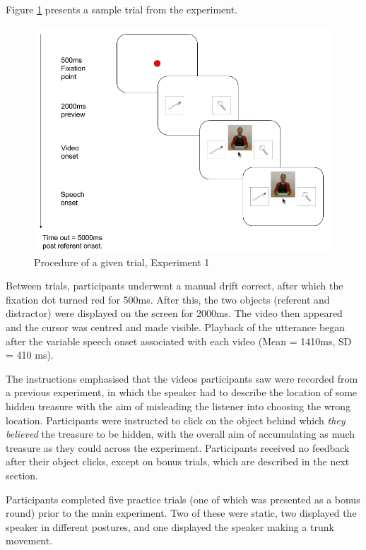 \documentclass[a4paper,man,natbib]{apa6}
\begin{document}
Figure \ref{fig:v1_trial} presents a sample trial from the experiment. 
\begin{figure}[Ht]
  \centering
	\includegraphics[width=\linewidth]{./img/e7_trial.png}
  \caption{Procedure of a given trial, Experiment 1}
  \label{fig:v1_trial}
\end{figure}
Between trials, participants underwent a manual drift correct, after which the fixation dot turned red for 500ms. 
After this, the two objects (referent and distractor) were displayed on the screen for 2000ms.
The video then appeared and the cursor was centred and made visible.
Playback of the utterance began after the variable speech onset associated with each video (Mean = 1410ms, SD = 410 ms). 

The instructions emphasised that the videos participants saw were recorded from a previous experiment, in which the speaker had to describe the location of some hidden treasure with the aim of misleading the listener into choosing the wrong location.
Participants were instructed to click on the object behind which \textit{they believed} the treasure to be hidden, with the overall aim of accumulating as much treasure as they could across the experiment.
Participants received no feedback after their object clicks, except on bonus trials, which are described in the next section.

Participants completed five practice trials (one of which was presented as a bonus round) prior to the main experiment. 
Two of these were static, two displayed the speaker in different postures, and one displayed the speaker making a trunk movement.
\end{document}
